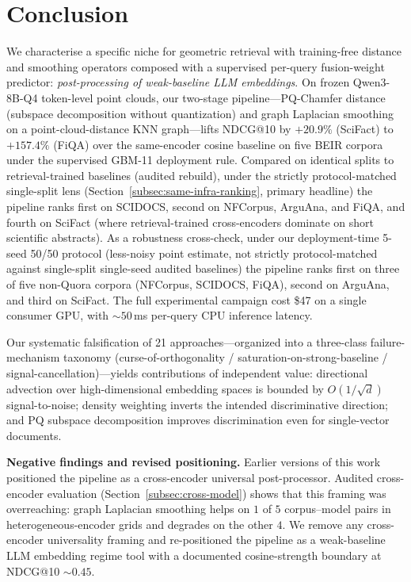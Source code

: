 \documentclass[review,1p]{elsarticle}
\begin{document}
\section{Conclusion}
\label{sec:conclusion}

We characterise a specific niche for geometric retrieval with training-free distance and smoothing operators composed with a supervised per-query fusion-weight predictor: \emph{post-processing of weak-baseline LLM embeddings}. On frozen Qwen3-8B-Q4 token-level point clouds, our two-stage pipeline---PQ-Chamfer distance (subspace decomposition without quantization) and graph Laplacian smoothing on a point-cloud-distance KNN graph---lifts NDCG@10 by $+20.9\%$ (SciFact) to $+157.4\%$ (FiQA) over the same-encoder cosine baseline on five BEIR corpora under the supervised GBM-11 deployment rule. Compared on identical splits to retrieval-trained baselines (audited rebuild), under the strictly protocol-matched single-split lens (Section~\ref{subsec:same-infra-ranking}, primary headline) the pipeline ranks first on SCIDOCS, second on NFCorpus, ArguAna, and FiQA, and fourth on SciFact (where retrieval-trained cross-encoders dominate on short scientific abstracts). As a robustness cross-check, under our deployment-time 5-seed 50/50 protocol (less-noisy point estimate, not strictly protocol-matched against single-split single-seed audited baselines) the pipeline ranks first on three of five non-Quora corpora (NFCorpus, SCIDOCS, FiQA), second on ArguAna, and third on SciFact. The full experimental campaign cost \$47 on a single consumer GPU, with ${\sim}50$\,ms per-query CPU inference latency.

Our systematic falsification of 21 approaches---organized into a three-class failure-mechanism taxonomy (curse-of-orthogonality / saturation-on-strong-baseline / signal-cancellation)---yields contributions of independent value: directional advection over high-dimensional embedding spaces is bounded by $O(1/\sqrt{d})$ signal-to-noise; density weighting inverts the intended discriminative direction; and PQ subspace decomposition improves discrimination even for single-vector documents.

\textbf{Negative findings and revised positioning.} Earlier versions of this work positioned the pipeline as a cross-encoder universal post-processor. Audited cross-encoder evaluation (Section~\ref{subsec:cross-model}) shows that this framing was overreaching: graph Laplacian smoothing helps on $1$ of $5$ corpus--model pairs in heterogeneous-encoder grids and degrades on the other $4$. We remove any cross-encoder universality framing and re-positioned the pipeline as a weak-baseline LLM embedding regime tool with a documented cosine-strength boundary at NDCG@10 ${\sim}0.45$.
\end{document}
